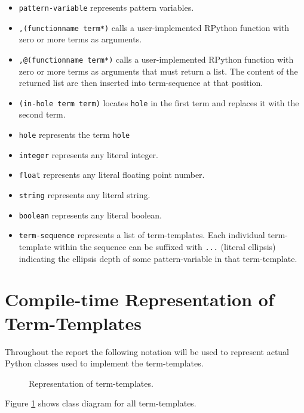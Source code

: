 \begin{itemize}
\item
\texttt{pattern-variable} represents pattern variables.
\item
\texttt{,(functionname term*)} calls a user-implemented RPython function with zero or more terms as arguments.
\item
\texttt{,@(functionname term*)} calls a user-implemented RPython function with zero or more terms as arguments that must return a list. The content of the returned list are then inserted into term-sequence at that position.
\item
\texttt{(in-hole term term)} locates \lstinline{hole} in the first term and replaces it with the second term.
\item
\texttt{hole} represents the term \lstinline{hole}
\item
\texttt{integer} represents any literal integer.
\item
\texttt{float} represents any literal floating point number.
\item
\texttt{string}  represents any literal string.
\item
\texttt{boolean}  represents any literal boolean.
\item
	\texttt{term-sequence} represents a list of term-templates.  Each individual term-template within the sequence can be suffixed with \texttt{...} (literal ellipsis) indicating the ellipsis depth of some pattern-variable in that term-template.
\end{itemize}

\section{Compile-time Representation of Term-Templates}

Throughout the report the following notation will be used to represent actual Python classes used to implement the term-templates.

\begin{figure}[ht]
	\centering
	\caption{Representation of term-templates.}
\label{class-diagram-termtemplate}
\end{figure}

Figure \ref{class-diagram-termtemplate} shows class diagram for all term-templates.


